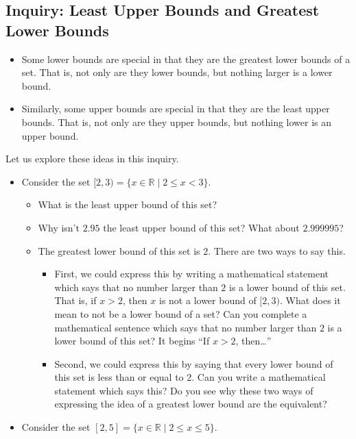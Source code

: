 \documentclass[11pt]{article}
\newenvironment{task}
	{\begin{mdframed}[linecolor=lightgray, linewidth=3pt]\raggedright}
	{\end{mdframed}}
\theoremstyle{definition}
\begin{document}
\subsection{Inquiry: Least Upper Bounds and Greatest Lower Bounds}
\begin{task}
  \begin{itemize}
    \item Some lower bounds are special in that they are the greatest lower bounds of a set. That is, not only are they lower
      bounds, but nothing larger is a lower bound.
    \item Similarly, some upper bounds are special in that they are the least upper bounds. That is, not only are they upper bounds,
      but nothing lower is an upper bound.
  \end{itemize}
  Let us explore these ideas in this inquiry.
  \begin{itemize}
    \item Consider the set $[2,3)=\{ x\in\mathbb{R} \mid 2 \leq x < 3 \}$. 
    \begin{itemize}
      \item What is the least upper bound of this set?
      \item Why isn't $2.95$ the least upper bound of this set? What about $2.999995$? 
      \item The greatest lower bound of this set is $2$. There are two ways to say this.
        \begin{itemize}
          \item First, we could express this by writing a mathematical statement which says that no number
          larger than $2$ is a lower bound of this set. That is, if $x > 2$, then $x$ is not a lower bound of $[2,3)$. What does it 
          mean to not be a lower bound of a set? Can you complete a mathematical sentence which says that no number
          larger than $2$ is a lower bound of this set? It begins ``If $x > 2$, then\dots''
        \item Second, we could express this by saying that every lower bound of this set is less than or equal to 2. Can you write a 
          mathematical statement which says this? Do you see why these two ways of expressing the idea of a greatest lower bound are
          the equivalent?
        \end{itemize}
    \end{itemize}
    \item Consider the set $[2,5]=\{ x\in\mathbb{R} \mid 2 \leq x \leq 5 \}$. 
      \begin{itemize}

\end{itemize}
\end{itemize}
\end{task}
\end{document}
